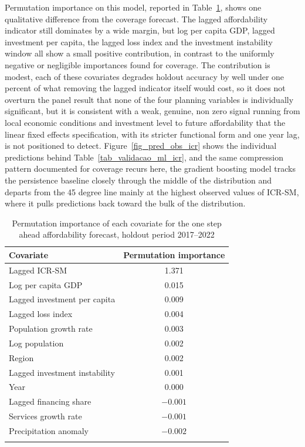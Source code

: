 \documentclass[pdflatex,sn-mathphys-num]{sn-jnl}%
\theoremstyle{thmstyleone}%
\theoremstyle{thmstyletwo}%
\theoremstyle{thmstylethree}%
\begin{document}
Permutation importance on this model, reported in Table~\ref{tab_ablation_icr}, shows one qualitative difference from the coverage forecast. The lagged affordability indicator still dominates by a wide margin, but log per capita GDP, lagged investment per capita, the lagged loss index and the investment instability window all show a small positive contribution, in contrast to the uniformly negative or negligible importances found for coverage. The contribution is modest, each of these covariates degrades holdout accuracy by well under one percent of what removing the lagged indicator itself would cost, so it does not overturn the panel result that none of the four planning variables is individually significant, but it is consistent with a weak, genuine, non zero signal running from local economic conditions and investment level to future affordability that the linear fixed effects specification, with its stricter functional form and one year lag, is not positioned to detect. Figure~\ref{fig_pred_obs_icr} shows the individual predictions behind Table~\ref{tab_validacao_ml_icr}, and the same compression pattern documented for coverage recurs here, the gradient boosting model tracks the persistence baseline closely through the middle of the distribution and departs from the 45 degree line mainly at the highest observed values of ICR-SM, where it pulls predictions back toward the bulk of the distribution.

\begin{table}[h]
\caption{Permutation importance of each covariate for the one step ahead affordability forecast, holdout period 2017--2022}\label{tab_ablation_icr}
\begin{tabular}{@{}lc@{}}
\toprule
Covariate & Permutation importance \\
\midrule
Lagged ICR-SM & 1.371 \\
Log per capita GDP & 0.015 \\
Lagged investment per capita & 0.009 \\
Lagged loss index & 0.004 \\
Population growth rate & 0.003 \\
Log population & 0.002 \\
Region & 0.002 \\
Lagged investment instability & 0.001 \\
Year & 0.000 \\
Lagged financing share & $-0.001$ \\
Services growth rate & $-0.001$ \\
Precipitation anomaly & $-0.002$ \\
\botrule
\end{tabular}
\end{table}
\end{document}

